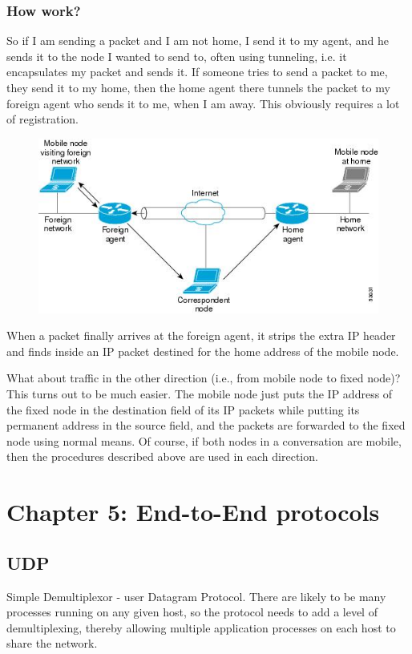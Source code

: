 \documentclass[11pt, a4paper]{article}
\begin{document}
\subsubsection{How work?}
So if I am sending a packet and I am not home, I send it to my agent, and he sends it to the node I wanted to send to, often using tunneling, i.e. it encapsulates my packet and sends it. If someone tries to send a packet to me, they send it to my home, then the home agent there tunnels the packet to my foreign agent who sends it to me, when I am away. This obviously requires a lot of registration.
\begin{figure}[H]
    \centering
    \includegraphics[width = \textwidth]{Pictures/MobileIPSending.jpg}
\end{figure}
When a packet finally arrives at the foreign agent, it strips the extra IP header and finds inside an IP packet destined for the home address of the mobile node.
\par
What about traffic in the other direction (i.e., from mobile node to fixed node)? This turns out to be much easier. The mobile node just puts the IP address of the fixed node in the destination field of its IP packets while putting its permanent address in the source field, and the packets are forwarded to the fixed node using normal means. Of course, if both nodes in a conversation are mobile, then the procedures described above are used in each direction.

\section{Chapter 5: End-to-End protocols}

\subsection{UDP}
Simple Demultiplexor - user Datagram Protocol. There are likely to be many processes running on any given host, so the protocol needs to add a level of demultiplexing, thereby allowing multiple application processes on each host to share the network.
\end{document}
